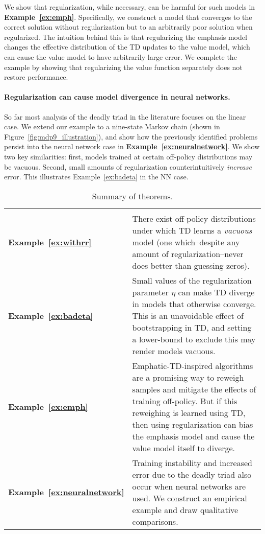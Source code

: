 We show that regularization, while necessary, can be harmful for such models in \textbf{Example~\ref{ex:emph}}. Specifically, we construct a model that converges to the correct solution without regularization but to an arbitrarily poor solution when regularized. The intuition behind this is that regularizing the emphasis model changes the effective distribution of the TD updates to the value model, which can cause the value model to have arbitrarily large error. We complete the example by showing that regularizing the value function separately does not restore performance.

\paragraph{Regularization can cause model divergence in neural networks. }
So far most analysis of the deadly triad in the literature focuses on the linear case. We extend our example to a nine-state Markov chain (shown in Figure~\ref{fig:mdp9_illustration}), and show how the previously identified problems persist into the neural network case in \textbf{Example~\ref{ex:neuralnetwork}}. We show two key similarities: first, models trained at certain off-policy distributions may be vacuous. Second, small amounts of regularization counterintuitively \emph{increase} error. This illustrates Example~\ref{ex:badeta} in the NN case.

\begin{table}
  \centering
  \begin{tabular}{p{} p{}}
    \toprule\toprule
    \\  \textbf{Example~\ref{ex:withrr}} & There exist off-policy distributions under which TD learns a \emph{vacuous} model (one which--despite any amount of regularization--never does better than guessing zeros).
    \\  \textbf{Example~\ref{ex:badeta}} & Small values of the regularization parameter $\eta$ can make TD diverge in models that otherwise converge. This is an unavoidable effect of bootstrapping in TD, and setting a lower-bound to exclude this may render models vacuous.
    \\  \textbf{Example~\ref{ex:emph}} & Emphatic-TD-inspired algorithms are a promising way to reweigh samples and mitigate the effects of training off-policy. But if this reweighing is learned using TD, then using regularization can bias the emphasis model and cause the value model itself to diverge.
    \\  \textbf{Example~\ref{ex:neuralnetwork}} & Training instability and increased error due to the deadly triad also occur when neural networks are used. We construct an empirical example and draw qualitative comparisons.
    \\ \bottomrule \bottomrule
  \end{tabular}
  \vspace{7pt}
  \caption{Summary of theorems. }
  \label{tab:summarytheorems}
\end{table}



